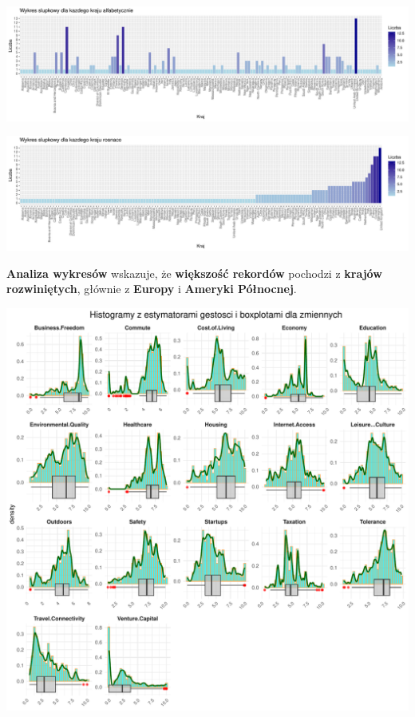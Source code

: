 \documentclass[
  12pt,
]{article}
\begin{document}
\begin{center}\includegraphics{Sprawozdanie2_files/figure-latex/wykresy_country_ilosc_rekordow-1} \end{center}

\begin{center}\includegraphics{Sprawozdanie2_files/figure-latex/wykresy_country_ilosc_rekordow-2} \end{center}

\textbf{Analiza wykresów} wskazuje, że \textbf{większość rekordów}
pochodzi z \textbf{krajów rozwiniętych}, głównie z \textbf{Europy} i
\textbf{Ameryki Północnej}.

\begin{center}\includegraphics{Sprawozdanie2_files/figure-latex/histogramy_ilosciowe1-1} \end{center}
\end{document}
